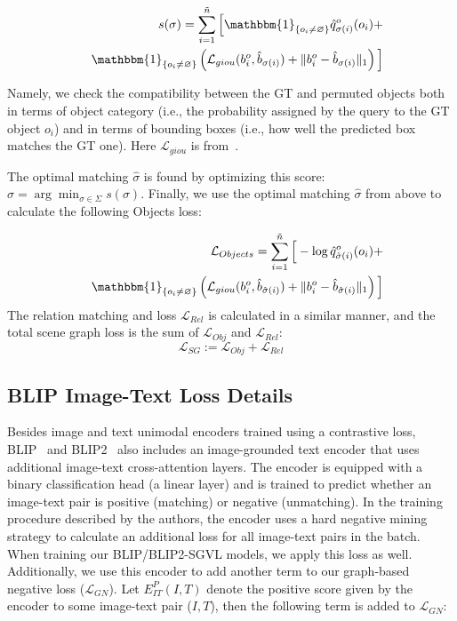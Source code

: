 \documentclass[11pt]{article}
\begin{document}
\small
\begin{eqnarray}
  &&   s(\sigma) = \sum_{i=1}^{\Tilde{n}}\Big[ \mathbbm{1}_{\{o_i \neq \varnothing\}}\hat{q}^o_{\sigma(i)}(o_i) + \nonumber \\
    && \mathbbm{1}_{\{o_i \neq \varnothing\}}\left(\mathcal{L}_{giou}(b^o_i,\hat{b}_{\sigma(i)}) + \lVert b^o_i-\hat{b}_{\sigma(i)}\rVert_{1}\right)\Big] 
\end{eqnarray}
\normalsize


Namely, we check the compatibility between the GT and permuted objects both in terms of object category (i.e., the probability assigned by the query to the GT object $o_i$) and in terms of bounding boxes (i.e., how well the predicted box matches the GT one). Here $\mathcal{L}_{giou}$ is from~\cite{giou_2018_CVPR}. 

The optimal matching $\hat{\sigma}$ is found by optimizing this score: $\hat{\sigma} = \arg\min_{\sigma \in \Sigma}  s(\sigma)$. Finally, we use the optimal matching $\hat{\sigma}$ from above to calculate the following Objects loss:

\small
\begin{eqnarray}
  && \mathcal{L}_{Objects} =   \sum_{i=1}^{\Tilde{n}}\Big[ -\log\hat{q}^o_{\hat{\sigma}(i)}(o_i) + \nonumber \\
    && \mathbbm{1}_{\{o_i \neq \varnothing\}}\left(\mathcal{L}_{giou}(b^o_i,\hat{b}_{\hat{\sigma}(i)}) + \lVert b^o_i-\hat{b}_{\hat{\sigma}(i)}\rVert_{1}\right)\Big]
\end{eqnarray}
\normalsize
The relation matching and loss $\mathcal{L}_{Rel}$ is calculated in a similar manner, and the total scene graph loss is the sum of $\mathcal{L}_{Obj}$ and $\mathcal{L}_{Rel}$:
\begin{equation}
\label{eq:sg}
\mathcal{L}_{SG} := \mathcal{L}_{Obj} + \mathcal{L}_{Rel}
\end{equation}





\subsection{BLIP Image-Text Loss Details} 
\label{supp:models:blip}
Besides image and text unimodal encoders trained using a contrastive loss,  BLIP~\cite{blip} and BLIP2~\cite{li2023blip2} also includes an image-grounded text encoder that uses additional image-text cross-attention layers. The encoder is equipped with a binary classification head (a linear layer) and is trained to predict whether an image-text pair is positive (matching) or negative (unmatching). In the training procedure described by the authors, the encoder uses a hard negative mining strategy to calculate an additional loss for all image-text pairs in the batch. When training our BLIP/BLIP2-SGVL models, we apply this loss as well. Additionally, we use this encoder to add another term to our graph-based negative loss ($\mathcal{L}_{GN}$). Let $E_{IT}^P(I,T)$ denote the positive score given by the encoder to some image-text pair ($I,T$), then the following term is added to $\mathcal{L}_{GN}$:
\end{document}
